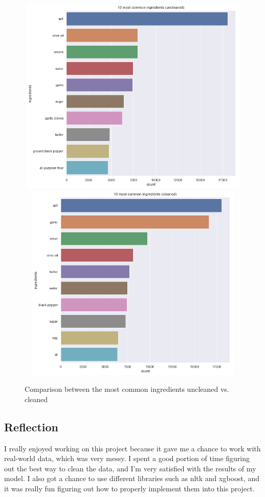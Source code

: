 \documentclass[12pt]{article}
\begin{document}
\begin{figure}[H]
\centering
\includegraphics[width=13cm, height=9.5cm]{10-most-common-ingredients-uncleaned.png}
\includegraphics[width=13cm, height=9.5cm]{10-most-common-ingredients-cleaned.png}
\caption{Comparison between the most common ingredients uncleaned vs. cleaned}
\label{fig: common-ingredients-comparison}
\end{figure}

\subsection{Reflection}

I really enjoyed working on this project because it gave me a chance to work with real-world data, which was very messy. I spent a good portion of time figuring out the best way to clean the data, and I'm very satisfied with the results of my model. I also got a chance to use different libraries such as nltk and xgboost, and it was really fun figuring out how to properly implement them into this project.
\end{document}
